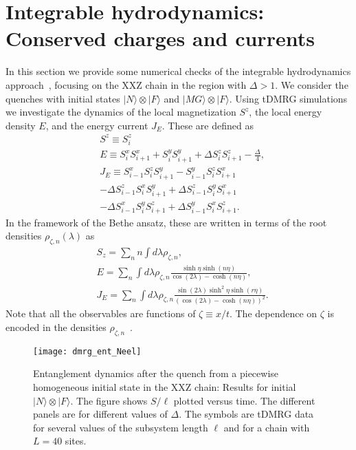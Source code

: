 \documentclass[twocolumn,superscriptaddress,prb,10pt]{revtex4-1}
\begin{document}
\section{Integrable hydrodynamics: Conserved charges and currents} 
\label{charge}

In this section we provide some numerical checks of the integrable hydrodynamics
approach~\cite{olalla-2016,bertini-2016}, focusing on the XXZ chain in the region with 
$\Delta>1$. We consider the quenches 
with initial states $|N\rangle\otimes|F\rangle$ and $|MG\rangle\otimes|F\rangle$. 
Using tDMRG simulations we investigate the dynamics of the local magnetization $S^z$, the 
local energy density $E$, and the energy current $J_E$. These are defined as~\cite{bertini-2016} 
%
\begin{align}
& S^z\equiv S_i^z\\
& E\equiv S_i^xS_{i+1}^x+S_i^yS_{i+1}^y+\Delta S_i^zS_{i+1}^z-\frac{\Delta}{4},\\
& J_E\equiv S_{i-1}^xS_i^zS_{i+1}^y-S_{i-1}^yS_i^zS_{i+1}^x\\\nonumber
&-\Delta S_{i-1}^zS_i^xS_{i+1}^y+\Delta S_{i-1}^zS_i^yS_{i+1}^x\\\nonumber
&-\Delta S_{i-1}^xS_i^yS_{i+1}^z+\Delta S_{i-1}^yS_i^xS_{i+1}^z. 
\end{align}
%
In the framework of the Bethe ansatz, these are written in terms of the root densities 
$\rho_{\zeta,n}(\lambda)$ as 
%
\begin{align}
\label{obs1}
& S_z=\sum_n n\int d\lambda\rho_{\zeta,n},\\
\label{obs2}
& E=\sum_n\int d\lambda\rho_{\zeta,n}\frac{\sinh\eta\sinh(n\eta)}{\cos(2\lambda)-\cosh(n \eta)},\\
\label{obs3}
& J_E=\sum_n\int d\lambda\rho_{\zeta,n}\frac{\sin(2\lambda)\sinh^2\eta\sinh(r\eta)}{
(\cos(2\lambda)-\cosh(n\eta))^2}. 
\end{align}
%
Note that all the observables are functions of $\zeta\equiv x/t$. The dependence on $\zeta$ is encoded 
in the densities $\rho_{\zeta,n}$~\cite{bertini-2016}. 

\begin{figure*}[t]
\texttt{[image: dmrg\_ent\_Neel]}
\caption{ Entanglement dynamics after the quench from a piecewise homogeneous 
 initial state in the XXZ chain: Results 
 for initial $|N\rangle\otimes|F\rangle$. 
 The figure shows $S/\ell$ plotted versus time. The different panels are for 
 different values of $\Delta$. The symbols are tDMRG data for several values of the 
 subsystem length $\ell$ and for a chain with $L=40$ sites. 
}
\label{fig5}
\end{figure*}
\end{document}
